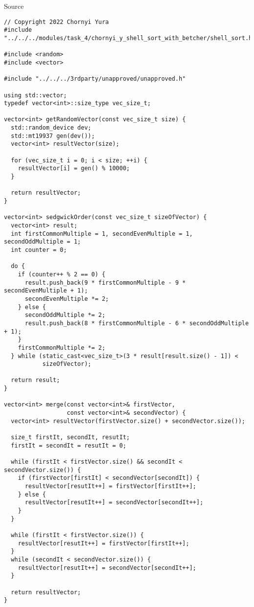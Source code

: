 \documentclass{report}
\begin{document}
\begin{center}
Source
\end{center}
\begin{lstlisting}
// Copyright 2022 Chornyi Yura
#include "../../../modules/task_4/chornyi_y_shell_sort_with_betcher/shell_sort.h"

#include <random>
#include <vector>

#include "../../../3rdparty/unapproved/unapproved.h"

using std::vector;
typedef vector<int>::size_type vec_size_t;

vector<int> getRandomVector(const vec_size_t size) {
  std::random_device dev;
  std::mt19937 gen(dev());
  vector<int> resultVector(size);

  for (vec_size_t i = 0; i < size; ++i) {
    resultVector[i] = gen() % 10000;
  }

  return resultVector;
}

vector<int> sedgwickOrder(const vec_size_t sizeOfVector) {
  vector<int> result;
  int firstCommonMultiple = 1, secondEvenMultiple = 1, secondOddMultiple = 1;
  int counter = 0;

  do {
    if (counter++ % 2 == 0) {
      result.push_back(9 * firstCommonMultiple - 9 * secondEvenMultiple + 1);
      secondEvenMultiple *= 2;
    } else {
      secondOddMultiple *= 2;
      result.push_back(8 * firstCommonMultiple - 6 * secondOddMultiple + 1);
    }
    firstCommonMultiple *= 2;
  } while (static_cast<vec_size_t>(3 * result[result.size() - 1]) <
           sizeOfVector);

  return result;
}

vector<int> merge(const vector<int>& firstVector,
                  const vector<int>& secondVector) {
  vector<int> resultVector(firstVector.size() + secondVector.size());

  size_t firstIt, secondIt, resutIt;
  firstIt = secondIt = resutIt = 0;

  while (firstIt < firstVector.size() && secondIt < secondVector.size()) {
    if (firstVector[firstIt] < secondVector[secondIt]) {
      resultVector[resutIt++] = firstVector[firstIt++];
    } else {
      resultVector[resutIt++] = secondVector[secondIt++];
    }
  }

  while (firstIt < firstVector.size()) {
    resultVector[resutIt++] = firstVector[firstIt++];
  }
  while (secondIt < secondVector.size()) {
    resultVector[resutIt++] = secondVector[secondIt++];
  }

  return resultVector;
}


\end{lstlisting}
\end{document}
